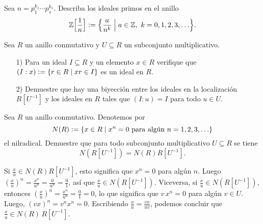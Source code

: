 \begin{ejercicio}
  Sea $n = p_1^{k_1}\cdots p_s^{k_s}$. Describa los ideales primos en el anillo
  \[ \mathbb{Z} \Bigl[\frac{1}{n}\Bigr] \mathrel{\mathop:}=
     \Bigl\{ \frac{a}{n^k} \Bigm| a\in \mathbb{Z}, ~ k = 0,1,2,3,\ldots \Bigr\}. \]
\end{ejercicio}

\begin{ejercicio}
  Sea $R$ un anillo conmutativo y $U \subseteq R$ un subconjunto multiplicativo.

  \begin{enumerate}
  \item[1)] Para un ideal $I \subseteq R$ y un elemento $x\in R$ verifique que
    $(I : x) \mathrel{\mathop:}= \{ r\in R \mid xr \in I \}$ es un ideal en $R$.

  \item[2)] Demuestre que hay una biyección entre los ideales en la localización
    $R [U^{-1}]$ y los ideales en $R$ tales que $(I : u) = I$ para todo
    $u\in U$.
  \end{enumerate}
\end{ejercicio}

\begin{ejercicio}
  Sea $R$ un anillo conmutativo. Denotemos por
  $$N (R) \mathrel{\mathop:}= \{ x\in R \mid x^n = 0 \text{ para algún }n=1,2,3,\ldots \}$$
  el nilradical. Demuestre que para todo subconjunto multiplicativo
  $U \subseteq R$ se tiene
  $$N (R [U^{-1}]) = N (R) R [U^{-1}].$$

  \ifdefined\solutions
  \begin{solucion}
    Si $\frac{x}{u}\in N (R) R [U^{-1}]$, esto significa que $x^n = 0$ para
    algún $n$. Luego
    $\left(\frac{x}{u}\right)^n = \frac{x^n}{u^n} = \frac{0}{u^n} =
    \frac{0}{1}$, así que $\frac{x}{u} \in N (R [U^{-1}])$. Viceversa, si
    $\frac{x}{u} \in N (R [U^{-1}])$, entonces
    $\left(\frac{x}{u}\right)^n = \frac{x^n}{u^n} = \frac{0}{1} = 0$, lo que
    significa que $v\,x^n = 0$ para algún $v \in U$. Luego,
    $(vx)^n = v^n x^n = 0$. Escribiendo $\frac{x}{u} = \frac{vx}{uv}$, podemos
    concluir que $\frac{x}{u} \in N (R)\,R [U^{-1}]$.
  \end{solucion}
  \fi
\end{ejercicio}

